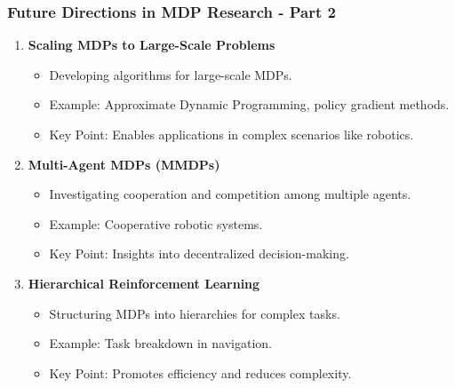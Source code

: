 \documentclass[aspectratio=169]{beamer}
\begin{document}
\begin{frame}[fragile]
    \frametitle{Future Directions in MDP Research - Part 2}
    \begin{enumerate}
        \item \textbf{Scaling MDPs to Large-Scale Problems}
            \begin{itemize}
                \item Developing algorithms for large-scale MDPs.
                \item Example: Approximate Dynamic Programming, policy gradient methods.
                \item Key Point: Enables applications in complex scenarios like robotics.
            \end{itemize}

        \item \textbf{Multi-Agent MDPs (MMDPs)}
            \begin{itemize}
                \item Investigating cooperation and competition among multiple agents.
                \item Example: Cooperative robotic systems.
                \item Key Point: Insights into decentralized decision-making.
            \end{itemize}

        \item \textbf{Hierarchical Reinforcement Learning}
            \begin{itemize}
                \item Structuring MDPs into hierarchies for complex tasks.
                \item Example: Task breakdown in navigation.
                \item Key Point: Promotes efficiency and reduces complexity.
            \end{itemize}
    \end{enumerate}
\end{frame}
\end{document}
